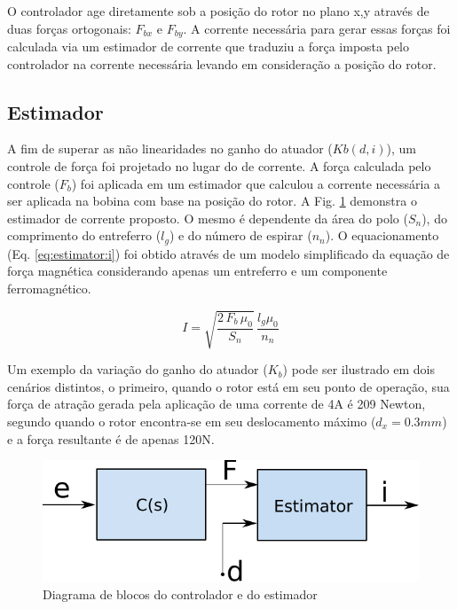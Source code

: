O controlador age diretamente sob a posição do rotor no plano x,y através de duas forças ortogonais: $F_{bx}$ e $F_{by}$. A corrente necessária para gerar essas forças foi calculada via um estimador de corrente que traduziu a força imposta pelo controlador na corrente necessária levando em consideração a posição do rotor.


\subsection{Estimador}
	
A fim de superar as não linearidades no ganho do atuador ($Kb(d,i)$), um controle de força foi projetado no lugar do de corrente. A força calculada pelo controle ($F_b$) foi aplicada em um estimador que calculou a corrente necessária a ser aplicada na bobina com base na posição do rotor. A Fig. \ref{fig:diagrama_controlador_estimador} demonstra o estimador de corrente proposto. O mesmo é dependente da área do polo ($S_n$), do comprimento do entreferro ($l_g$) e do número de espirar ($n_n$). O equacionamento (Eq. \eqref{eq:estimator:i}) foi obtido através de um modelo simplificado da equação de força magnética considerando apenas um entreferro e um componente ferromagnético.

	
\begin{equation}
I = \sqrt{\frac{2 \, F_b \, \mu_0}{S_n}} \, \frac{l_g \mu_0}{n_n}
\label{eq:estimator:i}
\end{equation}
	
Um exemplo da variação do ganho do atuador ($K_b$) pode ser ilustrado em dois cenários distintos, o primeiro, quando o rotor está em seu ponto de operação, sua força de atração gerada pela aplicação de uma corrente de 4A é 209 Newton, segundo quando o rotor encontra-se em seu deslocamento máximo ($d_x = 0.3 mm$) e a força resultante é de apenas 120N.

\begin{figure}[ht!]
	\centering
	\includegraphics[width=0.5\linewidth]{Figs/Modelagem/controlador_estimador}
	\caption{Diagrama de blocos do controlador e do estimador}
	\label{fig:diagrama_controlador_estimador}
\end{figure}

